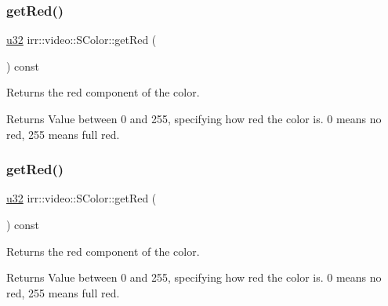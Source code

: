 \subsubsection{\texorpdfstring{get\+Red()}{getRed()}\hspace{0.1cm}{\footnotesize\ttfamily [1/2]}}
{\footnotesize\ttfamily \hyperlink{namespaceirr_a0416a53257075833e7002efd0a18e804}{u32} irr\+::video\+::\+S\+Color\+::get\+Red (\begin{DoxyParamCaption}{ }\end{DoxyParamCaption}) const\hspace{0.3cm}{\ttfamily [inline]}}



Returns the red component of the color. 

\begin{DoxyReturn}{Returns}
Value between 0 and 255, specifying how red the color is. 0 means no red, 255 means full red. 
\end{DoxyReturn}
\mbox{\label{classirr_1_1video_1_1SColor_a70d11ec2247581c79ee11e0e1b511978}} 
\subsubsection{\texorpdfstring{get\+Red()}{getRed()}\hspace{0.1cm}{\footnotesize\ttfamily [2/2]}}
{\footnotesize\ttfamily \hyperlink{namespaceirr_a0416a53257075833e7002efd0a18e804}{u32} irr\+::video\+::\+S\+Color\+::get\+Red (\begin{DoxyParamCaption}{ }\end{DoxyParamCaption}) const\hspace{0.3cm}{\ttfamily [inline]}}



Returns the red component of the color. 

\begin{DoxyReturn}{Returns}
Value between 0 and 255, specifying how red the color is. 0 means no red, 255 means full red. 
\end{DoxyReturn}
\mbox{\label{classirr_1_1video_1_1SColor_a2d82eec01be437076044d2330fa80322}} 

